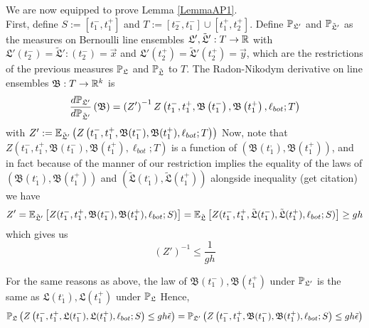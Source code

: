 	We are now equipped to prove Lemma \ref{LemmaAP1}.\\ 
	
	First, define $S:=[t_1^-, t_1^+]$ and $T:=[t_2^-, t_1^-]\cup [t_1^+,t_2^+]$. Define $\mathbb{P}_{\mathfrak L'}$ and $\mathbb{P}_{\tilde{\mathfrak{L}}'}$ as the measures on Bernoulli line ensembles $\mathfrak L', \tilde{\mathfrak{L}}': T\to \mathbb{R}$ with $\mathfrak L'(t_2^-)=\tilde{\mathfrak{L}}':(t_2^-)=\vec x$ and $\mathfrak L'(t_2^+)=\tilde{\mathfrak{L}}'(t_2^+)=\vec y$, which are the restrictions of the previous measures $\mathbb{P}_{\mathfrak L}$ and $\mathbb{P}_{\tilde{\mathfrak{L}}}$ to $T$. The Radon-Nikodym derivative on line ensembles $\mathfrak B: T\to \mathbb{R}^k$ is \begin{equation}\label{propRadon}\frac{d\mathbb{P}_{\mathfrak L'}}{d\mathbb{P}_{\tilde{\mathfrak L}'}}\left(\mathfrak B\right)=\left(Z'\right)^{-1}Z\left(t_1^-,t_1^+,\mathfrak{B}\left(t_1^-\right),\mathfrak{B}\left(t_1^+\right),\ell_{bot};T\right)
	\end{equation}
	with $Z':=\mathbb{E}_{\tilde{\mathfrak{L}}'}\left(Z\left(t_1^-, t_1^+, \mathfrak B(t_1^-), \mathfrak B(t_1^+), \ell_{bot}; T\right)\right)$ Now, note that $Z\left(t_1^-, t_1^+, \mathfrak B(t_1^-), \mathfrak B(t_1^+), \ell_{bot}; T\right)$ is a function of $(\mathfrak B(t_1^,), \mathfrak B(t_1^+))$, and in fact because of the manner of our restriction implies the equality of the laws of $\left(\mathfrak B(t_1^,), \mathfrak B(t_1^+)\right)$ and $(\tilde{\mathfrak L}(t_1^,), \tilde{\mathfrak L}(t_1^+))$ alongside inequality (get citation) we have
	\[
	Z'=\mathbb{E}_{\tilde{\mathfrak{L}}'}\left[Z(t_1^-, t_1^+, \mathfrak B(t_1^-),\mathfrak B(t_1^+),\ell_{bot};S)\right]=\mathbb{E}_{\tilde{\mathfrak{L}}}\left[Z(t_1^-, t_1^+, \tilde{\mathfrak L}(t_1^-),\tilde{\mathfrak L}(t_1^+),\ell_{bot};S)\right]\geq gh
\]
which gives us 
\begin{equation}
	\label{Zineq} \left(Z'\right)^{-1}\leq \frac{1}{gh}
\end{equation}

	For the same reasons as above, the law of $\mathfrak B(t_1^-), \mathfrak{B}(t_1^+)$ under $\mathbb{P}_{\mathfrak L'}$ is the same as $\mathfrak L(t_1^,), \mathfrak L(t_1^+)$ under $\mathbb{P}_{\mathfrak L}$ Hence,
	\begin{equation}
	\mathbb{P}_{\mathfrak L}\left(Z\left(t_1^-,t_1^+,\mathfrak L(t_1^-),\mathfrak L(t_1^+),\ell_{bot};S\right)\leq gh\tilde \epsilon\right)=\mathbb{P}_{\mathfrak L'}\left(Z\left(t_1^-,t_1^+,\mathfrak B(t_1^-),\mathfrak B(t_1^+),\ell_{bot};S\right)\leq gh\tilde \epsilon\right)
	\end{equation}
	
